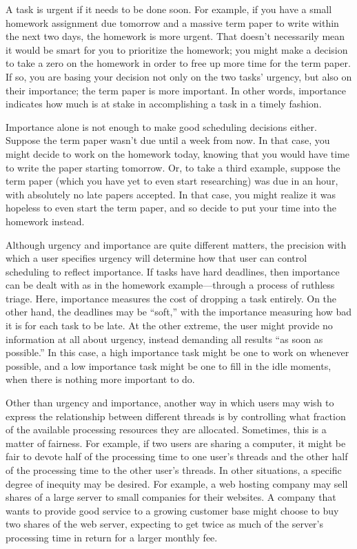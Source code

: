 A task is urgent if it needs to be done soon.  For example, if you
have a small homework assignment due tomorrow and a massive term
paper to write within the next two days, the homework is more urgent.
That doesn't necessarily mean it would be smart for you to prioritize
the homework; you might make a decision to take a zero on the homework
in order to free up more time for the term paper.  If so, you are
basing your decision not only on the two tasks' urgency, but also on
their importance; the term paper is more important.  In other words,
importance indicates how much is at stake in accomplishing a task in
a timely fashion.

Importance alone is not enough to make good scheduling decisions
either.  Suppose the term paper wasn't due until a week from now.  In
that case, you might decide to work on the homework today, knowing
that you would have time to write the paper starting tomorrow.  Or, to
take a third example, suppose the term paper (which you have yet to
even start researching) was due in an hour, with absolutely no late
papers accepted.  In that case, you might realize it was hopeless to
even start the term paper, and so decide to put your time into the
homework instead.

Although urgency and importance are quite different matters, the
precision with which a user specifies urgency will determine how that
user can control scheduling to reflect importance.  If tasks have
hard deadlines, then importance can be dealt with as in the
homework example---through a process of ruthless triage.  Here,
importance measures the cost of dropping a task entirely.  On the
other hand, the deadlines may be ``soft,'' with the importance
measuring how bad it is for each task to be late.  At the other
extreme, the user might provide no information at all about urgency,
instead demanding all results ``as soon as possible.''  In this case,
a high importance task might be one to work on whenever possible,
and a low importance task might be one to fill in the idle moments,
when there is nothing more important to do.

Other than urgency and importance, another way in which users may wish to express the relationship
between different threads is by controlling what fraction of the available
processing resources they are allocated.  Sometimes, this is a matter
of fairness.  For example, if two users are sharing a computer, it
might be fair to devote half of the processing time to one user's
threads and the other half of the processing time to the other user's
threads.  In other situations, a specific degree of inequity may be
desired.  For example, a web hosting company may
sell shares of a large server to small companies for their websites.
A company that wants to provide good service to a growing customer
base might choose to buy two shares of the web server, expecting to
get twice as much of the server's processing time in return for a
larger monthly fee.

